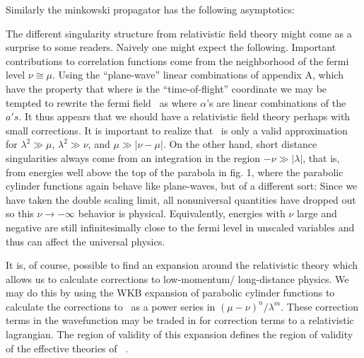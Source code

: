Similarly the minkowski propagator has the following 
asymptotics:
\eqn{}


The different singularity structure from relativistic field 
theory might come as a surprise to some readers. Naively one 
might expect the following. 
Important contributions to correlation functions come from 
the neighborhood of the fermi level $\nu\cong \mu$. 
Using the ``plane-wave'' linear combinations of appendix A, which 
have the property that
\eqn{}
where 
\eqn{}
is the ``time-of-flight'' coordinate we may be tempted to rewrite
the fermi field \field\ as
\eqn{}
where $\alpha$'s are linear combinations of the $a's$. 
It thus appears that we should have a relativistic field theory 
perhaps with small corrections.
It is important to realize 
that \appxi\ is only a valid approximation for $\lambda^2\gg \mu$,
$\lambda^2\gg\nu$, and $\mu\gg |\nu-\mu|$.
On the other hand, short distance 
singularities always come from an integration in the region 
$-\nu\gg |\lambda|$, that is, from energies well above
the top of the parabola in fig. 1,  where the parabolic cylinder functions
again behave like plane-waves, but of a different sort:
\eqn{} 
Since we have taken the double scaling limit,  all nonuniversal 
quantities have dropped out so this $\nu\to -\infty$ 
behavior is physical. Equivalently, energies with $\nu$ large and negative are
still infinitesimally close to the fermi level in unscaled variables 
and thus can affect the universal physics.

It is, of course, possible to find an expansion around the relativistic
theory which allows us to calculate corrections to low-momentum/
long-distance physics. We may do this by using the WKB expansion of
parabolic cylinder functions to calculate the corrections to \appxi\
as a power series in $(\mu-\nu)^n/\lambda^m$. These correction
terms in the wavefunction may be traded in for correction 
terms to a relativistic lagrangian. The region of 
validity of this expansion defines the region of validity
of the effective theories of 
\senwad\gk\dsjv\ . 

